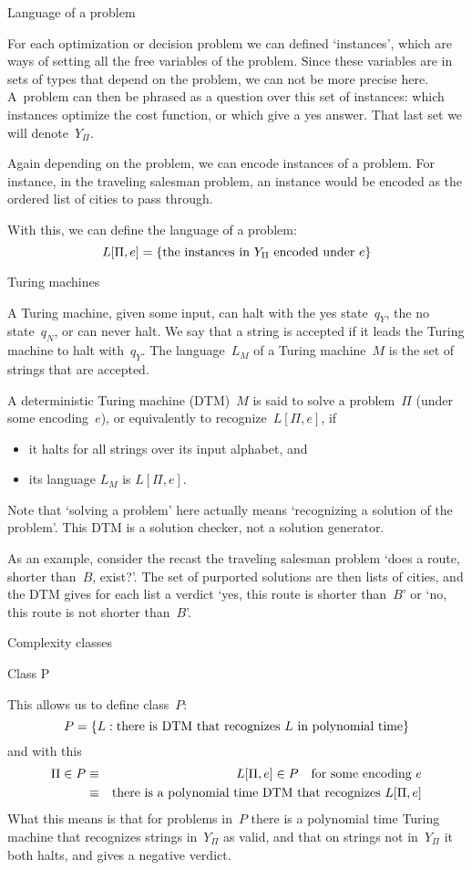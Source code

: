  {Language of a problem}

For each optimization or decision problem we can defined `instances',
which are ways of setting all the free variables of the problem. Since
these variables are in sets of types that depend on the problem, we
can not be more precise here. A~problem can then be phrased as a
question over this set of instances: which instances optimize the cost
function, or which give a yes answer. That last set we will
denote~$Y_\Pi$.

Again depending on the problem, we can encode instances of a
problem. For instance, in the traveling salesman problem, an instance
would be encoded as the ordered list of cities to pass through.

With this, we can define the language of a problem:
\[ L[\Pi,e]=\{ \hbox{the instances in $Y_\Pi$ encoded under $e$} \} \]

 {Turing machines}

A Turing machine, given some input, can halt with the yes state~$q_Y$,
the no state~$q_N$, or can never halt. We say that a string is
accepted if it leads the Turing machine to halt with~$q_Y$. The
language~$L_M$ of a Turing machine~$M$ is the set of strings that are accepted.

A deterministic Turing machine (DTM)~$M$ is said to solve a problem~$\Pi$
(under some encoding~$e$), or equivalently to recognize~$L[\Pi,e]$, if
\begin{itemize}
\item it halts for all strings over its input alphabet, and
\item its language $L_M$ is $L[\Pi,e]$.
\end{itemize}
Note that `solving a problem' here actually means `recognizing a
solution of the problem'. This DTM is a solution checker, not a
solution generator.

As an example, consider the recast  the traveling salesman problem
`does a route, shorter than~$B$, exist?'. The set of purported
solutions are then lists of cities, and the DTM gives for each list a
verdict `yes, this route is shorter than~$B$' or `no, this route is
not shorter than~$B$'.

 {Complexity classes}

 {Class P}

This allows us to define class~$P$:
\[ P=\{L:\hbox{there is DTM that recognizes $L$ in polynomial time}\} \]
and with this
\begin{eqnarray*}
 \Pi\in P&\equiv& L[\Pi,e]\in P\quad\hbox{for some encoding $e$}\\
        &\equiv&\hbox{there is a polynomial time DTM
                 that recognizes $L[\Pi,e]$}
\end{eqnarray*}
What this means is that for problems in~$P$ there is a polynomial time
Turing machine that recognizes strings in~$Y_\Pi$ as valid, and that
on strings not in~$Y_\Pi$ it both halts, and gives a negative verdict.

